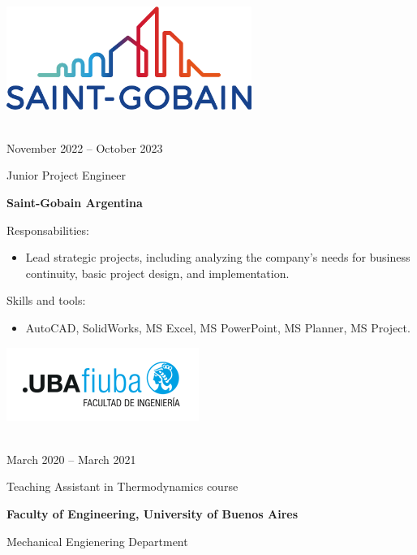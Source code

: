 \documentclass[a4paper,10pt]{article}
\newlength{\cvcolumngapwidth}
\newlength{\cvleftcolumnwidth}
\newlength{\cvrightcolumnwidth}
\newcommand{\cvtitlestyle}[1]{{\large\cvtitlefont\textcolor{cvtitlecolor}{#1}}}
\newcommand{\cvdurationstyle}[1]{{\small\cvdurationfont\textcolor{cvdurationcolor}{#1}}}
\newlength{\cvafteritemskipamount}
\newlength{\cvaftertitleskipamount}
\newlength{\cvparskip}
\newcommand{\cvitem}[2]{
    \begin{minipage}[t]{\cvleftcolumnwidth}
        \raggedleft #1
    \end{minipage}%
    \hspace{\cvcolumngapwidth}%
    \begin{minipage}[t]{\cvrightcolumnwidth}
        \setlength{\parskip}{\cvparskip} #2
    \end{minipage}

    \vspace{\cvafteritemskipamount}
}
\newcommand{\cvtitle}[1]{
    \cvtitlestyle{#1}

    \vspace{\cvaftertitleskipamount}
    \vspace{-\cvparskip}
}
\begin{document}
\cvitem{
 	\begin{minipage}{\textwidth}
   \begin{flushright}
		  \includegraphics[width=0.6\textwidth]{../logos-photos/Logo_SG.png}   
    \end{flushright}  
  \end{minipage} \\
  \vspace{0.3cm}
  \cvdurationstyle{November 2022 -- October 2023}
}{
    \cvtitle{Junior Project Engineer}

    \textbf{\large Saint-Gobain Argentina}
	
  Responsabilities:	
    \begin{itemize}
        \item Lead strategic projects, including analyzing the company's needs for business continuity, basic project
          design, and implementation.
    \end{itemize}

	Skills and tools:
	\begin{itemize}
		\item AutoCAD, SolidWorks, MS Excel, MS PowerPoint, MS Planner, MS Project.
	\end{itemize}

}

\cvitem{
 	\begin{minipage}{\textwidth}
   \begin{flushright}
		  \includegraphics[height=0.25\textwidth]{../logos-photos/Logo_FIUBA_new.png}   
    \end{flushright}  
  \end{minipage} \\
  \vspace{0.1cm}
  \cvdurationstyle{March 2020 -- March 2021}
}{
    \cvtitle{Teaching Assistant in Thermodynamics course}

    \textbf{\large Faculty of Engineering, University of Buenos Aires}

    Mechanical Engienering Department
}
\end{document}
